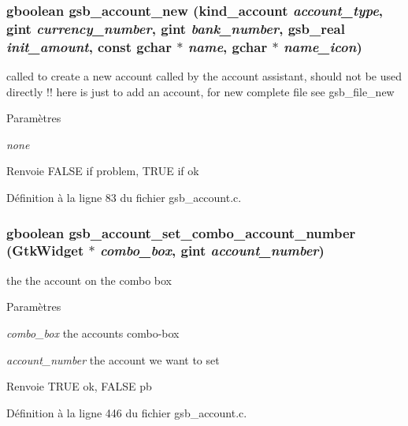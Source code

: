 \subsubsection[{gsb\_\-account\_\-new}]{\setlength{\rightskip}{0pt plus 5cm}gboolean gsb\_\-account\_\-new ({\bf kind\_\-account} {\em account\_\-type}, \/  gint {\em currency\_\-number}, \/  gint {\em bank\_\-number}, \/  {\bf gsb\_\-real} {\em init\_\-amount}, \/  const gchar $\ast$ {\em name}, \/  gchar $\ast$ {\em name\_\-icon})}\label{gsb__account_8c_a7cddd8b32f2176fe159c0dfa59dc074c}
called to create a new account called by the account assistant, should not be used directly !! here is just to add an account, for new complete file see gsb\_\-file\_\-new


\begin{DoxyParams}{Paramètres}
\item[{\em none}]\end{DoxyParams}
\begin{DoxyReturn}{Renvoie}
FALSE if problem, TRUE if ok 
\end{DoxyReturn}


Définition à la ligne 83 du fichier gsb\_\-account.c.

\subsubsection[{gsb\_\-account\_\-set\_\-combo\_\-account\_\-number}]{\setlength{\rightskip}{0pt plus 5cm}gboolean gsb\_\-account\_\-set\_\-combo\_\-account\_\-number (GtkWidget $\ast$ {\em combo\_\-box}, \/  gint {\em account\_\-number})}\label{gsb__account_8c_a7e2153dff1b7f36dd035c01a0e6bf25a}
the the account on the combo box


\begin{DoxyParams}{Paramètres}
\item[{\em combo\_\-box}]the accounts combo-\/box \item[{\em account\_\-number}]the account we want to set\end{DoxyParams}
\begin{DoxyReturn}{Renvoie}
TRUE ok, FALSE pb 
\end{DoxyReturn}


Définition à la ligne 446 du fichier gsb\_\-account.c.

